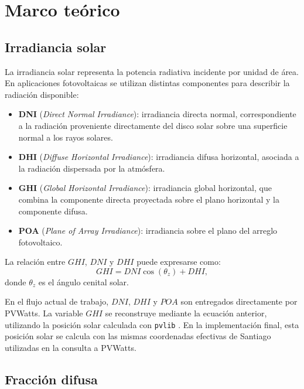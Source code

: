 \documentclass[12pt, letterpaper]{article}
\begin{document}

\section{Marco te\'orico}

\subsection{Irradiancia solar}

La irradiancia solar representa la potencia radiativa incidente por unidad de \'area. En aplicaciones fotovoltaicas se utilizan distintas componentes para describir la radiaci\'on disponible:

\begin{itemize}
    \item \textbf{DNI} (\textit{Direct Normal Irradiance}): irradiancia directa normal, correspondiente a la radiaci\'on proveniente directamente del disco solar sobre una superficie normal a los rayos solares.
    \item \textbf{DHI} (\textit{Diffuse Horizontal Irradiance}): irradiancia difusa horizontal, asociada a la radiaci\'on dispersada por la atm\'osfera.
    \item \textbf{GHI} (\textit{Global Horizontal Irradiance}): irradiancia global horizontal, que combina la componente directa proyectada sobre el plano horizontal y la componente difusa.
    \item \textbf{POA} (\textit{Plane of Array Irradiance}): irradiancia sobre el plano del arreglo fotovoltaico.
\end{itemize}

La relaci\'on entre \(GHI\), \(DNI\) y \(DHI\) puede expresarse como:
\[
    GHI = DNI \cos(\theta_z) + DHI,
\]
donde \(\theta_z\) es el \'angulo cenital solar.

En el flujo actual de trabajo, \(DNI\), \(DHI\) y \(POA\) son entregados directamente por PVWatts. La variable \(GHI\) se reconstruye mediante la ecuaci\'on anterior, utilizando la posici\'on solar calculada con \texttt{pvlib} . En la implementaci\'on final, esta posici\'on solar se calcula con las mismas coordenadas efectivas de Santiago utilizadas en la consulta a PVWatts.

\subsection{Fracci\'on difusa}
\end{document}
